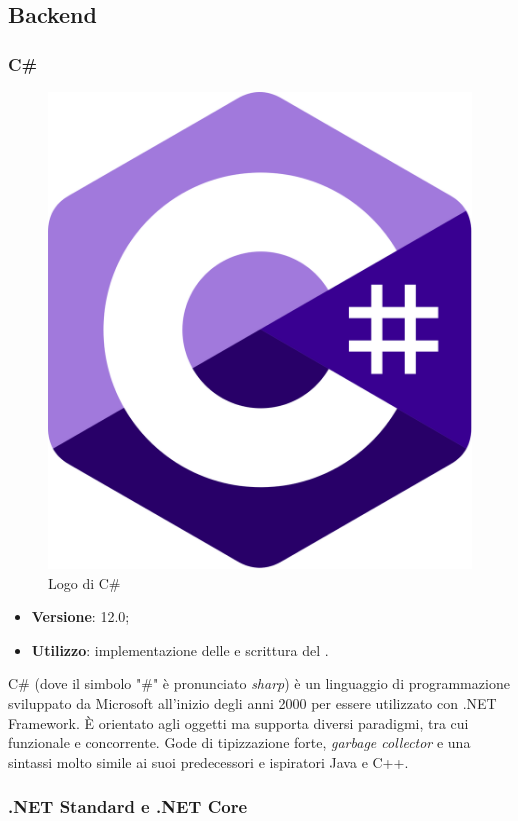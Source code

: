 



\subsection{Backend}

\subsubsection{C\#}

\begin{figure}[H]
    \centering 
    \includegraphics[width=0.15\columnwidth]{images/loghi/C_sharp-logo.png} 
    \caption{Logo di C\#}
\end{figure}

\begin{itemize}
    \item \textbf{Versione}: 12.0;
    \item \textbf{Utilizzo}: implementazione delle  e scrittura del .
\end{itemize}
C\# (dove il simbolo "\#" è pronunciato \emph{sharp}) è un linguaggio di programmazione sviluppato da Microsoft all'inizio degli anni 2000 per essere utilizzato con .NET Framework. È orientato agli oggetti ma supporta diversi paradigmi, tra cui funzionale e concorrente. Gode di tipizzazione forte, \emph{garbage collector} e una sintassi molto simile ai suoi predecessori e ispiratori Java e C++.

\subsubsection{.NET Standard e .NET Core}

